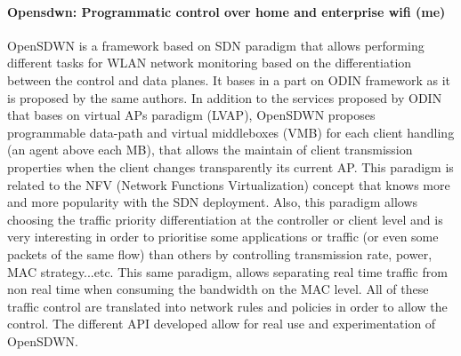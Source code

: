 \documentclass[journal,transmag]{IEEEtran}
\begin{document}
\paragraph{Opensdwn: Programmatic control over home and enterprise wifi
\cite{15OpenSDWN_home_entreprise_WIFI} (me)}
OpenSDWN is a framework based on SDN paradigm that allows performing different tasks for WLAN network monitoring based on the differentiation between the control and data planes. It bases in a part on ODIN framework \cite{14Odin:Programmatic_Orchestration_WiFi} as it is proposed by the same authors. In addition to the services proposed by ODIN that bases on virtual APs paradigm (LVAP), OpenSDWN proposes programmable data-path and virtual middleboxes (VMB) for each client handling (an agent above each MB), that allows the maintain of client transmission properties when the client changes transparently its current AP. This paradigm is related to the NFV (Network Functions Virtualization) concept that knows more and more popularity with the SDN deployment. Also, this paradigm allows choosing the traffic priority differentiation at the controller or client level and is very interesting in order to prioritise some applications or traffic (or even some packets of the same flow) than others by controlling transmission rate, power, MAC strategy...etc. This same paradigm, allows separating real time traffic from non real time when consuming the bandwidth on the MAC level. All of these traffic control are translated into network rules and policies in order to allow the control. The different API developed allow for real use and experimentation of OpenSDWN.\\       
\end{document}
